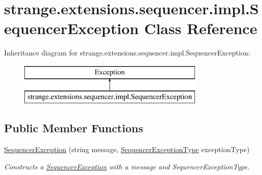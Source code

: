 \hypertarget{classstrange_1_1extensions_1_1sequencer_1_1impl_1_1_sequencer_exception}{\section{strange.\-extensions.\-sequencer.\-impl.\-Sequencer\-Exception Class Reference}
\label{classstrange_1_1extensions_1_1sequencer_1_1impl_1_1_sequencer_exception}
}
Inheritance diagram for strange.\-extensions.\-sequencer.\-impl.\-Sequencer\-Exception\-:\begin{figure}[H]
\begin{center}
\leavevmode
\includegraphics[height=2.000000cm]{classstrange_1_1extensions_1_1sequencer_1_1impl_1_1_sequencer_exception}
\end{center}
\end{figure}
\subsection*{Public Member Functions}
\begin{DoxyCompactItemize}
\item 
\hypertarget{classstrange_1_1extensions_1_1sequencer_1_1impl_1_1_sequencer_exception_a6d49942050ce35afe047465a2782627f}{\hyperlink{classstrange_1_1extensions_1_1sequencer_1_1impl_1_1_sequencer_exception_a6d49942050ce35afe047465a2782627f}{Sequencer\-Exception} (string message, \hyperlink{namespacestrange_1_1extensions_1_1sequencer_1_1api_aeddaacdea22f90d94ab298d24cbce41b}{Sequencer\-Exception\-Type} exception\-Type)}\label{classstrange_1_1extensions_1_1sequencer_1_1impl_1_1_sequencer_exception_a6d49942050ce35afe047465a2782627f}

\begin{DoxyCompactList}\small\item\em Constructs a \hyperlink{classstrange_1_1extensions_1_1sequencer_1_1impl_1_1_sequencer_exception}{Sequencer\-Exception} with a message and Sequencer\-Exception\-Type. \end{DoxyCompactList}\end{DoxyCompactItemize}
